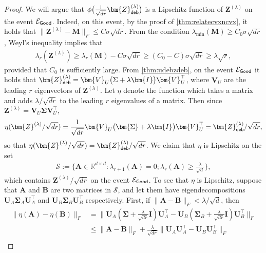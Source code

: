 \documentclass[10pt]{article}
\renewcommand{\t}{^{\top}}
\theoremstyle{definition}
\begin{document}
\begin{proof}
We will argue that $\phi\big( \frac{1}{\sqrt{dr}} \bm{Z}^{(\lambda)}_{{\sf deb}} \big)$ is a Lipschitz function of $\bm{Z}^{(\lambda)}$ on the event $\mathcal{E}_{{\sf Good}}$. Indeed, on this event, by the proof of \cref{thm:relatecvxncvx}, it holds that $\|\bm{Z}^{(\lambda)} - \bm{M} \|_F\leq C \sigma \sqrt{dr}$. From the condition $\lambda_{\min}(\bm{M}) \geq C_0 \sigma \sqrt{dr}$,  Weyl's inequality implies that
\begin{align}
\lambda_r(\bm{Z}^{(\lambda)}) \geq \lambda_r(\bm{M}) - C \sigma \sqrt{dr} \geq (C_0 - C) \sigma \sqrt{dr} \geq \lambda \sqrt{r},
\end{align}
provided that $C_0$ is sufficiently large.  From \cref{thm:udebzdeb}, on the event $\mathcal{E}_{{\sf Good}}$ it holds that $\bm{Z}^{(\lambda)}_{{\sf deb}} = \bm{V}_U \big( \Sigma + \lambda \bm{I} \big) \bm{V}_U\t$, where $\bm{V}_U$ are the leading $r$ eigenvectors of $\bm{Z}^{(\lambda)}$.  Let $\eta$ denote the function which takes a matrix and adds $\lambda/\sqrt{dr}$ to the leading $r$ eigenvalues of a matrix.  Then since $\bm{Z}^{(\lambda)} = \bm{V}_U \bm{\Sigma} \bm{V}_U\t$,
\begin{align}
    \eta( \bm{Z}^{(\lambda)}/\sqrt{dr}) = \frac{1}{\sqrt{dr}}\bm{V}_U \big(  \bm{\Sigma} + \lambda \bm{I} \big) \bm{V}_U\t = \bm{Z}^{(\lambda)}_{{\sf deb}}/\sqrt{dr},
\end{align}
so that $\eta(\bm{Z}^{(\lambda)}/\sqrt{dr}) = \bm{Z}_{{\sf deb}}^{(\lambda)}/\sqrt{dr}$.  We claim that $\eta $ is Lipschitz on the set
\begin{align}
  \mathcal{S} :=  \{\bm{A} \in\mathbb{R}^{d\times d} : \lambda_{r+1}(\bm{A}) =0; \lambda_{r}(\bm{A}) \geq \frac{\lambda}{\sqrt{d}}\},
\end{align}
which contains $\bm{Z}^{(\lambda)}/\sqrt{dr}$ on the event $\mathcal{E}_{{\sf Good}}$.  
To see that $\eta$ is Lipschitz, suppose that $\bm{A}$ and $\bm{B}$ are two matrices in $\mathcal{S}$, and let them have eigendecompositions $\bm{U}_A \bm{\Sigma}_A \bm{U}_A\t$ and $\bm{U}_B \bm{\Sigma}_B \bm{U}_B\t$ respectively.  First, if $\|\bm{A} - \bm{B} \|_F < \lambda/\sqrt{d}$, then
\begin{align}
    \| \eta (\bm{A} ) - \eta (\bm{B}) \|_F &= \| \bm{U}_A (\bm{\Sigma} + \frac{\lambda}{\sqrt{dr}}\bm{I}) \bm{U}_A\t - \bm{U}_B ( \bm{\Sigma}_B + \frac{\lambda}{\sqrt{dr}} \bm{I}) \bm{U}_B\t \|_F \\
    &\leq \| \bm{A} - \bm{B} \|_F +\frac{\lambda}{\sqrt{dr}} \| \bm{U}_A \bm{U}_A\t - \bm{U}_B \bm{U}_B\t \|_F \\

\end{align}
\end{proof}
\end{document}
